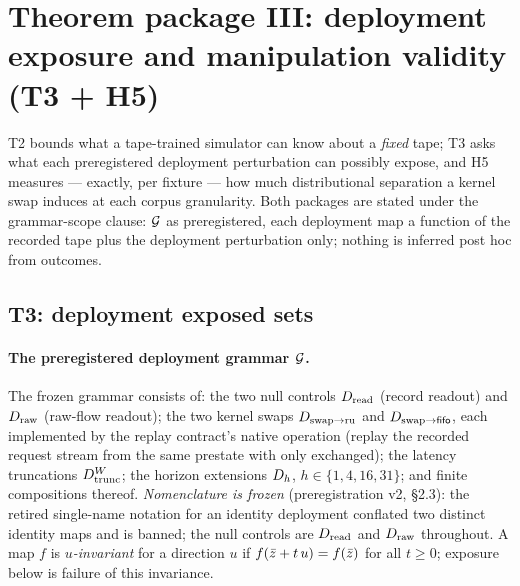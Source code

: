 \section{Theorem package III: deployment exposure and manipulation validity (T3 + H5)}
\label{sec:t3h5}

T2 bounds what a tape-trained simulator can know about a \emph{fixed} tape;
T3 asks what each preregistered deployment perturbation can possibly expose,
and H5 measures --- exactly, per fixture --- how much distributional
separation a kernel swap induces at each corpus granularity. Both packages
are stated under the grammar-scope clause: $\Gdep$ as preregistered, each
deployment map a function of the recorded tape plus the deployment
perturbation only; nothing is inferred post hoc from outcomes.

\subsection{T3: deployment exposed sets}
\label{sec:t3-grammar}

\paragraph{The preregistered deployment grammar $\Gdep$.} The frozen grammar
consists of: the two null controls $\Dread$ (record readout) and $\Draw$
(raw-flow readout); the two kernel swaps $\Dswapru$ and $\Dswapfifo$, each
implemented by the replay contract's native operation (replay the recorded
request stream from the same prestate with only 
exchanged); the latency truncations $\Dtrunc[W]$; the horizon extensions
$\Dh[h]$, $h \in \{1,4,16,31\}$; and finite compositions thereof.
\emph{Nomenclature is frozen} (preregistration v2, \S2.3): the retired
single-name notation for an identity deployment conflated two distinct
identity maps and is banned; the null controls are $\Dread$ and $\Draw$
throughout. A map $f$ is \emph{$u$-invariant} for a direction $u$ if
$f(\bar{\rawflow} + t\,u) = f(\bar{\rawflow})$ for all $t \geq 0$; exposure
below is failure of this invariance.

